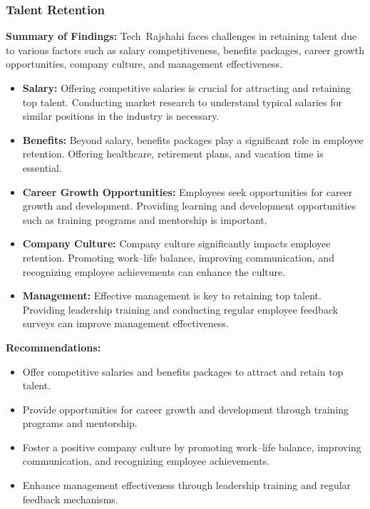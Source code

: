 \documentclass[12pt,a4paper]{article}
\begin{document}
\subsubsection{Talent Retention}
\textbf{Summary of Findings:} Tech Rajshahi faces challenges in retaining talent due to various factors such as salary competitiveness, benefits packages, career growth opportunities, company culture, and management effectiveness.
\begin{itemize}
    \item \textbf{Salary:} Offering competitive salaries is crucial for attracting and retaining top talent.  Conducting market research to understand typical salaries for similar positions in the industry is necessary.
    \item \textbf{Benefits:} Beyond salary, benefits packages play a significant role in employee retention.  Offering healthcare, retirement plans, and vacation time is essential.
    \item \textbf{Career Growth Opportunities:} Employees seek opportunities for career growth and development.  Providing learning and development opportunities such as training programs and mentorship is important.
    \item \textbf{Company Culture:} Company culture significantly impacts employee retention.  Promoting work–life balance, improving communication, and recognizing employee achievements can enhance the culture.
    \item \textbf{Management:} Effective management is key to retaining top talent.  Providing leadership training and conducting regular employee feedback surveys can improve management effectiveness.
\end{itemize}
\textbf{Recommendations:}
\begin{itemize}
    \item Offer competitive salaries and benefits packages to attract and retain top talent.
    \item Provide opportunities for career growth and development through training programs and mentorship.
    \item Foster a positive company culture by promoting work–life balance, improving communication, and recognizing employee achievements.
    \item Enhance management effectiveness through leadership training and regular feedback mechanisms.
\end{itemize}
\end{document}
